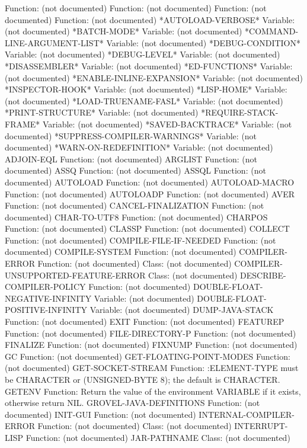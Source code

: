   Function: (not documented)
  Function: (not documented)
  Function: (not documented)
  Function: (not documented)
*AUTOLOAD-VERBOSE*
  Variable: (not documented)
*BATCH-MODE*
  Variable: (not documented)
*COMMAND-LINE-ARGUMENT-LIST*
  Variable: (not documented)
*DEBUG-CONDITION*
  Variable: (not documented)
*DEBUG-LEVEL*
  Variable: (not documented)
*DISASSEMBLER*
  Variable: (not documented)
*ED-FUNCTIONS*
  Variable: (not documented)
*ENABLE-INLINE-EXPANSION*
  Variable: (not documented)
*INSPECTOR-HOOK*
  Variable: (not documented)
*LISP-HOME*
  Variable: (not documented)
*LOAD-TRUENAME-FASL*
  Variable: (not documented)
*PRINT-STRUCTURE*
  Variable: (not documented)
*REQUIRE-STACK-FRAME*
  Variable: (not documented)
*SAVED-BACKTRACE*
  Variable: (not documented)
*SUPPRESS-COMPILER-WARNINGS*
  Variable: (not documented)
*WARN-ON-REDEFINITION*
  Variable: (not documented)
ADJOIN-EQL
  Function: (not documented)
ARGLIST
  Function: (not documented)
ASSQ
  Function: (not documented)
ASSQL
  Function: (not documented)
AUTOLOAD
  Function: (not documented)
AUTOLOAD-MACRO
  Function: (not documented)
AUTOLOADP
  Function: (not documented)
AVER
  Function: (not documented)
CANCEL-FINALIZATION
  Function: (not documented)
CHAR-TO-UTF8
  Function: (not documented)
CHARPOS
  Function: (not documented)
CLASSP
  Function: (not documented)
COLLECT
  Function: (not documented)
COMPILE-FILE-IF-NEEDED
  Function: (not documented)
COMPILE-SYSTEM
  Function: (not documented)
COMPILER-ERROR
  Function: (not documented)
  Class: (not documented)
COMPILER-UNSUPPORTED-FEATURE-ERROR
  Class: (not documented)
DESCRIBE-COMPILER-POLICY
  Function: (not documented)
DOUBLE-FLOAT-NEGATIVE-INFINITY
  Variable: (not documented)
DOUBLE-FLOAT-POSITIVE-INFINITY
  Variable: (not documented)
DUMP-JAVA-STACK
  Function: (not documented)
EXIT
  Function: (not documented)
FEATUREP
  Function: (not documented)
FILE-DIRECTORY-P
  Function: (not documented)
FINALIZE
  Function: (not documented)
FIXNUMP
  Function: (not documented)
GC
  Function: (not documented)
GET-FLOATING-POINT-MODES
  Function: (not documented)
GET-SOCKET-STREAM
  Function: :ELEMENT-TYPE must be CHARACTER or (UNSIGNED-BYTE 8); the default is CHARACTER.
GETENV
  Function: Return the value of the environment VARIABLE if it exists, otherwise return NIL.
GROVEL-JAVA-DEFINITIONS
  Function: (not documented)
INIT-GUI
  Function: (not documented)
INTERNAL-COMPILER-ERROR
  Function: (not documented)
  Class: (not documented)
INTERRUPT-LISP
  Function: (not documented)
JAR-PATHNAME
  Class: (not documented)
